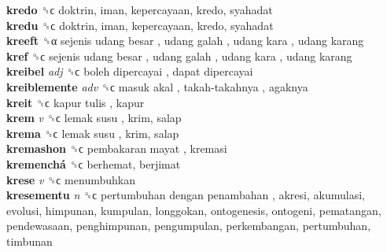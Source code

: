 \textbf{kredo} ␝ϲ  doktrin, iman, kepercayaan, kredo, syahadat  \\
\textbf{kredu} ␝ϲ  doktrin, iman, kepercayaan, kredo, syahadat  \\
\textbf{kreeft} ␝α   sejenis udang besar ,  udang galah ,  udang kara ,  udang karang   \\
\textbf{kref} ␝ϲ   sejenis udang besar ,  udang galah ,  udang kara ,  udang karang   \\
\textbf{kreibel} \emph{adj}  ␝ϲ   boleh dipercayai ,  dapat dipercayai   \\
\textbf{kreiblemente} \emph{adv}  ␝ϲ   masuk akal ,  takah-takahnya , agaknya  \\
\textbf{kreit} ␝ϲ   kapur tulis , kapur  \\
\textbf{krem} \emph{v}  ␝ϲ   lemak susu , krim, salap  \\
\textbf{krema} ␝ϲ   lemak susu , krim, salap  \\
\textbf{kremashon} ␝ϲ   pembakaran mayat , kremasi  \\
\textbf{kremenchá} ␝ϲ  berhemat, berjimat  \\
\textbf{krese} \emph{v}  ␝ϲ  menumbuhkan  \\
\textbf{kresementu} \emph{n}  ␝ϲ   pertumbuhan dengan penambahan , akresi, akumulasi, evolusi, himpunan, kumpulan, longgokan, ontogenesis, ontogeni, pematangan, pendewasaan, penghimpunan, pengumpulan, perkembangan, pertumbuhan, timbunan  \\
